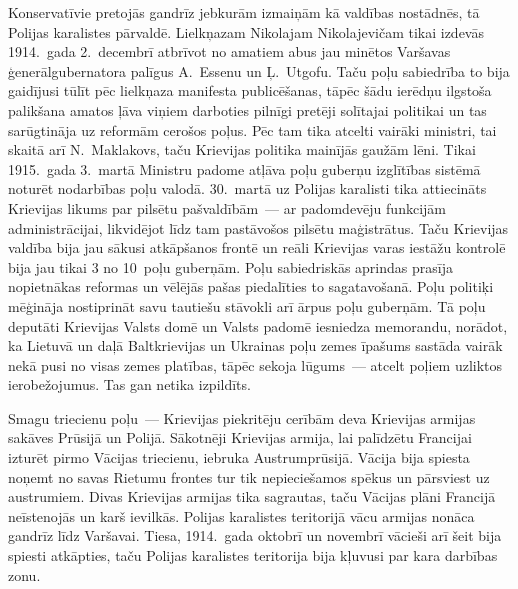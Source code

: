 \documentclass[twoside,a5paper,12pt,fleqn,openany]{extbook}
\begin{document}
Konservatīvie pretojās gandrīz jebkurām izmaiņām kā valdības nostādnēs, tā Polijas karalistes pārvaldē. Lielkņazam Nikolajam Nikolajevičam tikai izdevās 1914.~gada 2.~decembrī atbrīvot no amatiem abus jau minētos Varšavas ģenerālgubernatora palīgus A.~Essenu un Ļ.~Utgofu. Taču poļu sabiedrība to bija gaidījusi tūlīt pēc lielkņaza manifesta publicēšanas, tāpēc šādu ierēdņu ilgstoša palikšana amatos ļāva viņiem darboties pilnīgi pretēji solītajai politikai un tas sarūgtināja uz reformām cerošos poļus. Pēc tam tika atcelti vairāki ministri, tai skaitā arī N.~Maklakovs, taču Krievijas politika mainījās gaužām lēni. Tikai 1915.~gada 3.~martā Ministru padome atļāva poļu guberņu izglītības sistēmā noturēt nodarbības poļu valodā. 30.~martā uz Polijas karalisti tika attiecināts Krievijas likums par pilsētu pašvaldībām~--- ar padomdevēju funkcijām administrācijai, likvidējot līdz tam pastāvošos pilsētu maģistrātus. Taču Krievijas valdība bija jau sākusi atkāpšanos frontē un reāli Krievijas varas iestāžu kontrolē bija jau tikai 3 no 10~poļu guberņām. Poļu sabiedriskās aprindas prasīja nopietnākas reformas un vēlējās pašas piedalīties to sagatavošanā. Poļu politiķi mēģināja nostiprināt savu tautiešu stāvokli arī ārpus poļu guberņām. Tā poļu deputāti Krievijas Valsts domē un Valsts padomē iesniedza memorandu, norādot, ka Lietuvā un daļā Baltkrievijas un Ukrainas poļu zemes īpašums sastāda vairāk nekā pusi no visas zemes platības, tāpēc sekoja lūgums~--- atcelt poļiem uzliktos ierobežojumus. Tas gan netika izpildīts.

Smagu triecienu poļu~--- Krievijas piekritēju cerībām deva Krievijas armijas sakāves Prūsijā un Polijā. Sākotnēji Krievijas armija, lai palīdzētu Francijai izturēt pirmo Vācijas triecienu, iebruka Austrumprūsijā. Vācija bija spiesta noņemt no savas Rietumu frontes tur tik nepieciešamos spēkus un pārsviest uz austrumiem. Divas Krievijas armijas tika sagrautas, taču Vācijas plāni Francijā neīstenojās un karš ievilkās. Polijas karalistes teritorijā vācu armijas nonāca gandrīz līdz Varšavai. Tiesa, 1914.~gada oktobrī un novembrī vācieši arī šeit bija spiesti atkāpties, taču Polijas karalistes teritorija bija kļuvusi par kara darbības zonu.
\end{document}
